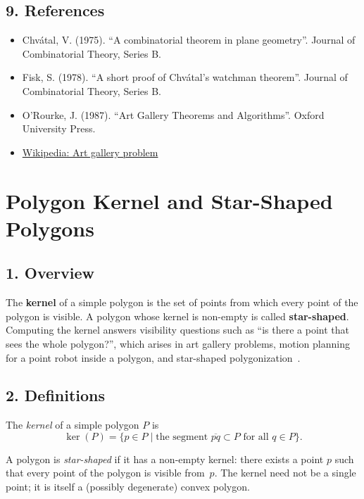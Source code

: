 \subsection{9. References}
\begin{itemize}
    \item Chv\'{a}tal, V. (1975). ``A combinatorial theorem in plane geometry''. Journal of Combinatorial Theory, Series B.
    \item Fisk, S. (1978). ``A short proof of Chv\'{a}tal's watchman theorem''. Journal of Combinatorial Theory, Series B.
    \item O'Rourke, J. (1987). ``Art Gallery Theorems and Algorithms''. Oxford University Press.
    \item \href{https://en.wikipedia.org/wiki/Art_gallery_problem}{Wikipedia: Art gallery problem}
\end{itemize}

\section{Polygon Kernel and Star-Shaped Polygons}
\label{sec:polygon_kernel}

\subsection{1. Overview}
The \textbf{kernel} of a simple polygon is the set of points from which every point of the polygon is visible. A polygon whose kernel is non-empty is called \textbf{star-shaped}. Computing the kernel answers visibility questions such as ``is there a point that sees the whole polygon?'', which arises in art gallery problems, motion planning for a point robot inside a polygon, and star-shaped polygonization~\cite{laszlo1996}.

\subsection{2. Definitions}

\begin{definition}\label{def:polygon_kernel}
The \emph{kernel} of a simple polygon $P$ is
\[
\ker(P) = \{p \in P \mid \text{the segment } \overline{pq} \subset P \text{ for all } q \in P\}.
\]
\end{definition}

\begin{definition}\label{def:star_shaped}
A polygon is \emph{star-shaped} if it has a non-empty kernel: there exists a point $p$ such that every point of the polygon is visible from~$p$. The kernel need not be a single point; it is itself a (possibly degenerate) convex polygon.
\end{definition}

